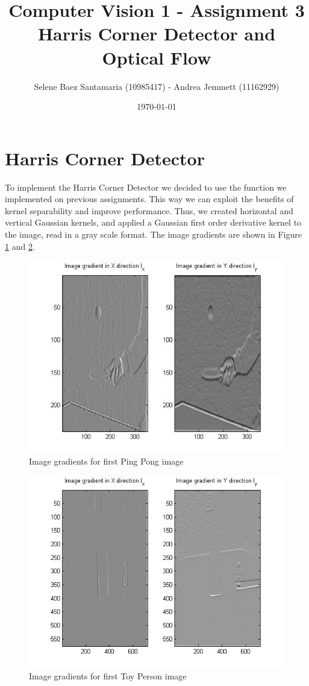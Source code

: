 \documentclass[11pt]{article}
\title{
	{Computer Vision 1 - Assignment 3 \\
	Harris Corner Detector and Optical Flow}
}
\author{
Selene Baez Santamaria (10985417) - Andrea Jemmett (11162929)}
\date{\today}
\begin{document}
\maketitle

\section{Harris Corner Detector}
To implement the Harris Corner Detector we decided to use the function we
implemented on previous assignments. This way we can exploit the benefits of
kernel separability and improve performance. Thus, we created horizontal and
vertical Gaussian kernels, and applied a Gaussian first order derivative kernel to the image, read in a gray scale format. The image gradients are shown in Figure
\ref{fig:partialDerivatives_pingpong} and \ref{fig:partialDerivatives_person}.

\begin{figure}[H] \centering
	\includegraphics[width=.8\textwidth]{imgs/derivatives_pingpong.jpg}
	\caption{Image gradients for first Ping Pong image}
	\label{fig:partialDerivatives_pingpong}
\end{figure}

\begin{figure}[H] \centering
	\includegraphics[width=.8\textwidth]{imgs/derivatives_person.jpg}
	\caption{Image gradients for first Toy Person image}
	\label{fig:partialDerivatives_person}
\end{figure}
\end{document}
